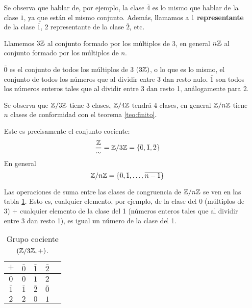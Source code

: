 Se observa que hablar de, por ejemplo, la clase $\bar{4}$ es lo mismo que hablar de la clase $\bar{1}$, ya que están el mismo conjunto. Además, llamamos a 1 \textbf{representante} de la clase $\bar{1}$, 2 representante de la clase $\bar{2}$, etc.

Llamemos $3\mathbb{Z}$ al conjunto formado por los múltiplos de 3, en general $n\mathbb{Z}$ al conjunto formado por los múltiplos de $n$.

$\bar{0}$ es el conjunto de todos los múltiplos de 3 $(3\mathbb{Z})$, o lo que es lo mismo, el conjunto de todos los números que al dividir entre 3 dan resto nulo. $\bar{1}$ son todos los números enteros tales que al dividir entre 3 dan resto 1, análogamente para $\bar{2}$.

Se observa que $\mathbb{Z}/3\mathbb{Z}$ tiene 3 clases, $\mathbb{Z}/4\mathbb{Z}$ tendrá 4 clases, en general $\mathbb{Z}/n\mathbb{Z}$ tiene $n$ clases de conformidad con el teorema \ref{teo:finito}.


Este es precisamente el conjunto cociente:
\[ \frac{\mathbb{Z}}{\sim} = \mathbb{Z} / 3\mathbb{Z} = \{ \bar{0}, \bar{1}, \bar{2} \}\]
En general
\[ \mathbb{Z} / n \mathbb{Z} = \{ \bar{0}, \bar{1}, \dots, \overline{n-1} \} \]

Las operaciones de suma entre las clases de congruencia de $\mathbb{Z}/n\mathbb{Z}$ se ven en las tabla \ref{tab:sclase}. Esto es, cualquier elemento, por ejemplo, de la clase del 0 (múltiplos de 3) $+$ cualquier elemento de la clase del 1 (números enteros tales que al dividir entre 3 dan resto 1), es igual un número de la clase del 1.

\begin{table}[H]
	\centering
	\begin{tabular}{c|cccc}
		$+$ & $\bar{0}$ & $\bar{1}$ & $\bar{2}$\\
		\hline
		$\bar{0}$ & $\bar{0}$ & $\bar{1}$ & $\bar{2}$\\
		$\bar{1}$ & $\bar{1}$ & $\bar{2}$ & $\bar{0}$\\
		$\bar{2}$ & $\bar{2}$ & $\bar{0}$ & $\bar{1}$
	\end{tabular}
	\caption{ Grupo cociente $\left( \mathbb{Z}/3\mathbb{Z}, + \right)$.}
	\label{tab:sclase}
\end{table}

